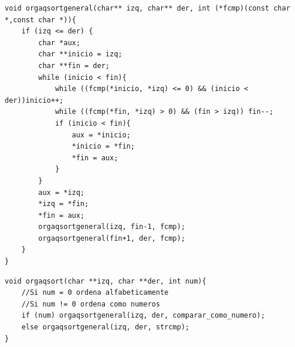 \documentclass[a4paper, 12pt]{article}
\begin{document}
	\begin{lstlisting}
void orgaqsortgeneral(char** izq, char** der, int (*fcmp)(const char *,const char *)){
    if (izq <= der) {
        char *aux;
        char **inicio = izq;
        char **fin = der;
        while (inicio < fin){
            while ((fcmp(*inicio, *izq) <= 0) && (inicio < der))inicio++;
            while ((fcmp(*fin, *izq) > 0) && (fin > izq)) fin--;
            if (inicio < fin){
                aux = *inicio;
                *inicio = *fin;
                *fin = aux;
            }
        }
        aux = *izq;
        *izq = *fin;
        *fin = aux;
        orgaqsortgeneral(izq, fin-1, fcmp);
        orgaqsortgeneral(fin+1, der, fcmp);
    }
}
	\end{lstlisting}
	
	\begin{lstlisting}
void orgaqsort(char **izq, char **der, int num){
    //Si num = 0 ordena alfabeticamente
    //Si num != 0 ordena como numeros
    if (num) orgaqsortgeneral(izq, der, comparar_como_numero);
    else orgaqsortgeneral(izq, der, strcmp);
}
	\end{lstlisting}
	
\end{document}
